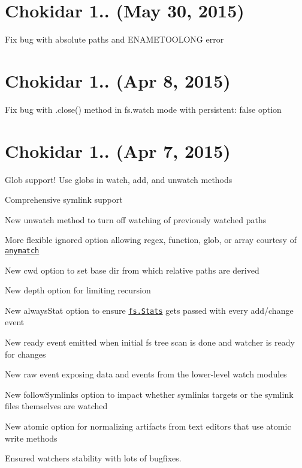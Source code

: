 \section*{Chokidar 1.. (May 30, 2015)}


\begin{DoxyItemize}
\item Fix bug with absolute paths and E\+N\+A\+M\+E\+T\+O\+O\+L\+O\+NG error
\end{DoxyItemize}

\section*{Chokidar 1.. (Apr 8, 2015)}


\begin{DoxyItemize}
\item Fix bug with {\ttfamily .close()} method in {\ttfamily fs.\+watch} mode with {\ttfamily persistent\+: false} option
\end{DoxyItemize}

\section*{Chokidar 1.. (Apr 7, 2015)}


\begin{DoxyItemize}
\item Glob support! Use globs in {\ttfamily watch}, {\ttfamily add}, and {\ttfamily unwatch} methods
\item Comprehensive symlink support
\item New {\ttfamily unwatch} method to turn off watching of previously watched paths
\item More flexible {\ttfamily ignored} option allowing regex, function, glob, or array courtesy of \href{https://github.com/es128/anymatch}{\tt anymatch}
\item New {\ttfamily cwd} option to set base dir from which relative paths are derived
\item New {\ttfamily depth} option for limiting recursion
\item New {\ttfamily always\+Stat} option to ensure \href{https://nodejs.org/api/fs.html#fs_class_fs_stats}{\tt {\ttfamily fs.\+Stats}} gets passed with every add/change event
\item New {\ttfamily ready} event emitted when initial fs tree scan is done and watcher is ready for changes
\item New {\ttfamily raw} event exposing data and events from the lower-\/level watch modules
\item New {\ttfamily follow\+Symlinks} option to impact whether symlinks\textquotesingle{} targets or the symlink files themselves are watched
\item New {\ttfamily atomic} option for normalizing artifacts from text editors that use atomic write methods
\item Ensured watcher\textquotesingle{}s stability with lots of bugfixes.
\end{DoxyItemize}

